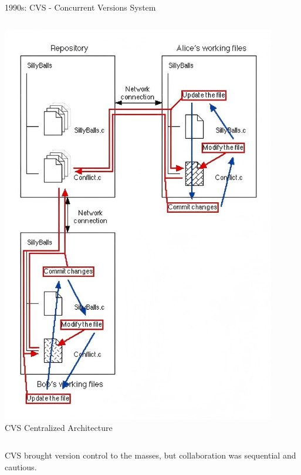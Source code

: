 \documentclass{beamer}
\begin{document}
\begin{frame}[t]{1990s: CVS - Concurrent Versions System}
\begin{columns}
\begin{column}{0.4\textwidth}
        \includegraphics[width=0.9\textwidth]{images/cvs.jpg}
        \\\scriptsize{CVS Centralized Architecture}
    \end{column}
\end{columns}
\begin{block}{}
CVS brought version control to the masses, but collaboration was sequential and cautious.
\end{block}
\end{frame}
\end{document}
